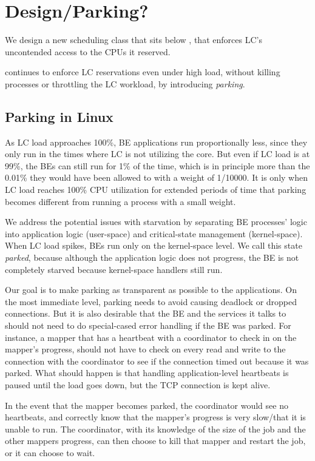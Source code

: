 \section{Design/Parking?}\label{s:design}

We design a new scheduling class \beclass{} that sits below \normalclass{}, that
enforces LC's uncontended access to the CPUs it reserved. 

\beclass{} continues to enforce LC reservations even under high load, without
killing \beclass{} processes or throttling the LC workload, by introducing
\textit{parking}.

\subsection{Parking in Linux}

As LC load approaches 100\%, BE applications run proportionally less, since they
only run in the times where LC is not utilizing the core. But even if LC load
is at 99\%, the BEs can still run for 1\% of the time, which is in principle more
than the 0.01\% they would have been allowed to with a weight of 1/10000. It is
only when LC load reaches 100\% CPU utilization for extended periods of time
that parking becomes different from running a process with a small weight.

We address the potential issues with starvation by separating BE processes'
logic into application logic (user-space) and critical-state management
(kernel-space). When LC load spikes, BEs run only on the kernel-space level. We
call this state \textit{parked}, because although the application logic does not
progress, the BE is not completely starved because kernel-space handlers still
run.

Our goal is to make parking as transparent as possible to the applications. On
the most immediate level, parking needs to avoid causing deadlock or dropped
connections. But it is also desirable that the BE and the services it talks to
should not need to do special-cased error handling if the BE was parked. For
instance, a mapper that has a heartbeat with a coordinator to check in on the
mapper's progress, should not have to check on every read and write to the
connection with the coordinator to see if the connection timed out because it
was parked. What should happen is that handling application-level heartbeats is
paused until the load goes down, but the TCP connection is kept alive. 

In the event that the mapper becomes parked, the coordinator would see no
heartbeats, and correctly know that the mapper's progress is very slow/that it
is unable to run. The coordinator, with its knowledge of the size of the job and
the other mappers progress, can then choose to kill that mapper and restart the
job, or it can choose to wait.


